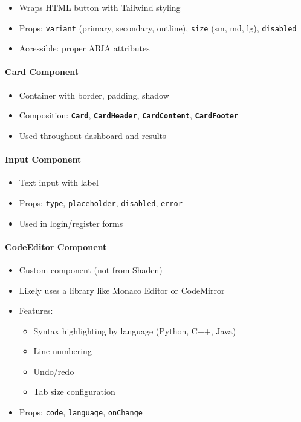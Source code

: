 \documentclass[12pt,a4paper,oneside]{article}
\newcommand{\classname}[1]{\texttt{\textbf{#1}}}
\newcommand{\varname}[1]{\texttt{#1}}
\begin{document}
\begin{itemize}
    \item Wraps HTML button with Tailwind styling
    \item Props: \varname{variant} (primary, secondary, outline), \varname{size} (sm, md, lg), \varname{disabled}
    \item Accessible: proper ARIA attributes
\end{itemize}

\paragraph{Card Component}

\begin{itemize}
    \item Container with border, padding, shadow
    \item Composition: \classname{Card}, \classname{CardHeader}, \classname{CardContent}, \classname{CardFooter}
    \item Used throughout dashboard and results
\end{itemize}

\paragraph{Input Component}

\begin{itemize}
    \item Text input with label
    \item Props: \varname{type}, \varname{placeholder}, \varname{disabled}, \varname{error}
    \item Used in login/register forms
\end{itemize}

\paragraph{CodeEditor Component}

\begin{itemize}
    \item Custom component (not from Shadcn)
    \item Likely uses a library like Monaco Editor or CodeMirror
    \item Features:
    \begin{itemize}
        \item Syntax highlighting by language (Python, C++, Java)
        \item Line numbering
        \item Undo/redo
        \item Tab size configuration
    \end{itemize}
    \item Props: \varname{code}, \varname{language}, \varname{onChange}
\end{itemize}
\end{document}
